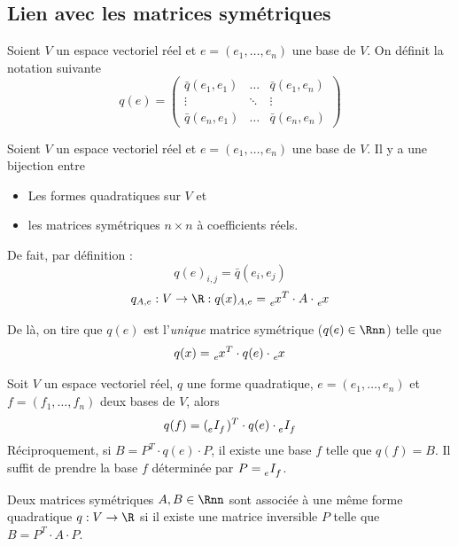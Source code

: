 \subsection{Lien avec les matrices symétriques}

\begin{mynota}
	Soient $V$ un espace vectoriel réel et $e = (e_1, \dots , e_n)$ une base de $V$.
	On définit la notation suivante
	\[ q(e) =
	\begin{pmatrix}
		\bar{q}(e_1,e_1) & \ldots & \bar{q}(e_1,e_n)\\
		\vdots & \ddots & \vdots\\
		\bar{q}(e_n,e_1) & \ldots & \bar{q}(e_n,e_n)
	\end{pmatrix}
	\]
\end{mynota}

\begin{myprop}
	Soient $V$ un espace vectoriel réel et $e = (e_1, \dots , e_n)$ une base de $V$.
	Il y a une bijection entre
	\begin{itemize}
		\item Les formes quadratiques sur $V$ et
		\item les matrices symétriques $n \times n$ à coefficients réels.
	\end{itemize}
	De fait, par définition :
	\[ q(e)_{i,j} = \bar{q}(e_i, e_j) \]
	\[ q_{A,e} : V \rightarrow \R : q(x)_{A,e} = \tensor[_e]{x}{^T} \cdot A \cdot \tensor[_e]{x}{} \]
\end{myprop}

\begin{mycorr}
	De là, on tire que $q(e)$ est l'\emph{unique} matrice symétrique ($q(e) \in \Rnn$) telle que
	\[ q(x) = \tensor[_e]{x}{^T} \cdot q(e) \cdot \tensor[_e]{x}{} \]
\end{mycorr}

\begin{mycorr} Soit $V$ un espace vectoriel réel, $q$ une forme quadratique, $e = (e_1, \dots , e_n)$ et $f = (f_1, \dots, f_n)$ deux bases de $V$, alors
	\[ q(f) = (\tensor[_e]{I}{_f})^T \cdot q(e) \cdot \tensor[_e]{I}{_f} \]
	Réciproquement, si $B = P^T \cdot q(e) \cdot P$, il existe une base $f$ telle que $q(f) = B$.
	Il suffit de prendre la base $f$ déterminée par $P = \tensor[_e]{I}{_f}$.
\end{mycorr}

\begin{myrem}
	Deux matrices symétriques $A, B \in \Rnn$ sont associée à une même forme quadratique $q: V \to \R$ si il existe une matrice inversible $P$ telle que $B = P^T \cdot A \cdot P$.
\end{myrem}

